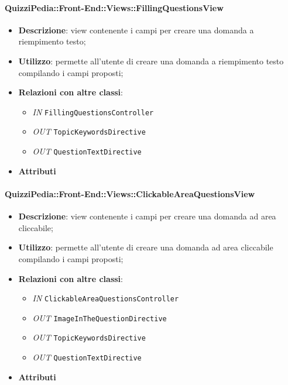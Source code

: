\paragraph{QuizziPedia::Front-End::Views::FillingQuestionsView}
\begin{itemize}
	\item \textbf{Descrizione}: view contenente i campi per creare una domanda a riempimento testo;
	\item \textbf{Utilizzo}:  permette all'utente di creare una domanda a riempimento testo compilando i campi proposti;
	\item \textbf{Relazioni con altre classi}:
	\begin{itemize}
		\item \textit{IN} \texttt{FillingQuestionsController} \\
		\item \textit{OUT} \texttt{TopicKeywordsDirective} \\
		\item \textit{OUT} \texttt{QuestionTextDirective} \\ 
	\end{itemize}
	\item \textbf{Attributi}
\end{itemize}

\paragraph{QuizziPedia::Front-End::Views::ClickableAreaQuestionsView}
\begin{itemize}
	\item \textbf{Descrizione}: view contenente i campi per creare una domanda ad area cliccabile;
	\item \textbf{Utilizzo}:  permette all'utente di creare una domanda ad area cliccabile compilando i campi proposti;
	\item \textbf{Relazioni con altre classi}:
	\begin{itemize}
		\item \textit{IN} \texttt{ClickableAreaQuestionsController} \\
		\item \textit{OUT} \texttt{ImageInTheQuestionDirective} \\
		\item \textit{OUT} \texttt{TopicKeywordsDirective} \\
		\item \textit{OUT} \texttt{QuestionTextDirective} \\ 
	\end{itemize}
	\item \textbf{Attributi}
\end{itemize}

